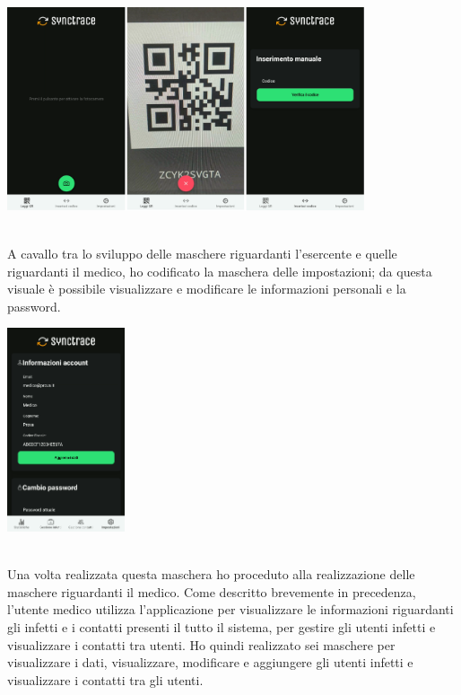 \begin{minipage}{\linewidth}
  \centering
    \includegraphics[height=6cm]{immagini/app/es}
\end{minipage}\\

A cavallo tra lo sviluppo delle maschere riguardanti l'esercente e quelle riguardanti il medico, ho codificato la maschera delle impostazioni; da questa visuale è possibile visualizzare e modificare le informazioni personali e la password. \\

\begin{minipage}{\linewidth}
  \centering
    \includegraphics[height=6cm]{immagini/app/settings}
\end{minipage}\\

Una volta realizzata questa maschera ho proceduto alla realizzazione delle maschere riguardanti il medico. Come descritto brevemente in precedenza, l'utente medico utilizza l'applicazione per visualizzare le informazioni riguardanti gli infetti e i contatti presenti il tutto il sistema, per gestire gli utenti infetti e visualizzare i contatti tra utenti. Ho quindi realizzato sei maschere per visualizzare i dati, visualizzare, modificare e aggiungere gli utenti infetti e visualizzare i contatti tra gli utenti. \\

